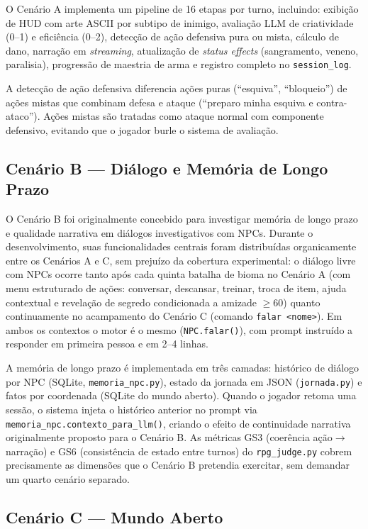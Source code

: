 \documentclass[12pt]{article}
\begin{document}
O Cenário A implementa um pipeline de 16 etapas por turno, incluindo: exibição de HUD com arte ASCII por subtipo de inimigo, avaliação LLM de criatividade (0--1) e eficiência (0--2), detecção de ação defensiva pura ou mista, cálculo de dano, narração em \textit{streaming}, atualização de \textit{status effects} (sangramento, veneno, paralisia), progressão de maestria de arma e registro completo no \texttt{session\_log}.

A detecção de ação defensiva diferencia ações puras (``esquiva'', ``bloqueio'') de ações mistas que combinam defesa e ataque (``preparo minha esquiva e contra-ataco''). Ações mistas são tratadas como ataque normal com componente defensivo, evitando que o jogador burle o sistema de avaliação.

\subsection{Cenário B --- Diálogo e Memória de Longo Prazo}

O Cenário B foi originalmente concebido para investigar memória de longo prazo e qualidade narrativa em diálogos investigativos com NPCs. Durante o desenvolvimento, suas funcionalidades centrais foram distribuídas organicamente entre os Cenários A e C, sem prejuízo da cobertura experimental: o diálogo livre com NPCs ocorre tanto após cada quinta batalha de bioma no Cenário A (com menu estruturado de ações: conversar, descansar, treinar, troca de item, ajuda contextual e revelação de segredo condicionada a amizade $\geq 60$) quanto continuamente no acampamento do Cenário C (comando \texttt{falar~<nome>}). Em ambos os contextos o motor é o mesmo (\texttt{NPC.falar()}), com prompt instruído a responder em primeira pessoa e em 2--4 linhas.

A memória de longo prazo é implementada em três camadas: histórico de diálogo por NPC (SQLite, \texttt{memoria\_npc.py}), estado da jornada em JSON (\texttt{jornada.py}) e fatos por coordenada (SQLite do mundo aberto). Quando o jogador retoma uma sessão, o sistema injeta o histórico anterior no prompt via \texttt{memoria\_npc.contexto\_para\_llm()}, criando o efeito de continuidade narrativa originalmente proposto para o Cenário B. As métricas GS3 (coerência ação$\to$narração) e GS6 (consistência de estado entre turnos) do \texttt{rpg\_judge.py} cobrem precisamente as dimensões que o Cenário B pretendia exercitar, sem demandar um quarto cenário separado.

\subsection{Cenário C --- Mundo Aberto}
\end{document}
